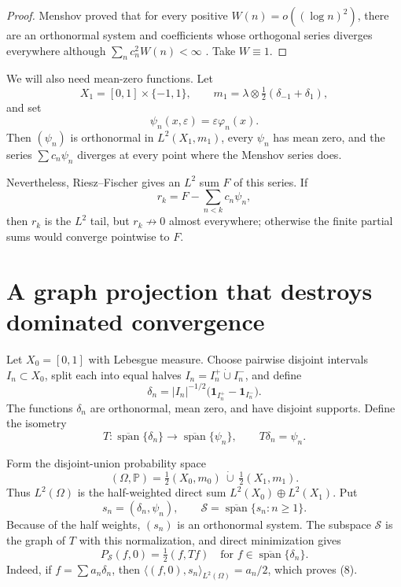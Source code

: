 \documentclass[11pt]{article}
\newcommand{\cS}{\mathcal S}
\begin{document}
\begin{proof}
Menshov proved that for every positive
\(W(n)=o((\log n)^2)\), there are an orthonormal system and coefficients
whose orthogonal series diverges everywhere although
\(\sum_n c_n^2W(n)<\infty\) \cite{Menshov}. Take \(W\equiv1\).
\end{proof}

We will also need mean-zero functions. Let
\[
 X_1=[0,1]\times\{-1,1\},
 \qquad m_1=\lambda\otimes\tfrac12(\delta_{-1}+\delta_1),
\]
and set
\[
 \psi_n(x,\varepsilon)=\varepsilon\varphi_n(x).
 \tag{3}
\]
Then \((\psi_n)\) is orthonormal in \(L^2(X_1,m_1)\), every \(\psi_n\)
has mean zero, and the series \(\sum c_n\psi_n\) diverges at every point
where the Menshov series does.

Nevertheless, Riesz--Fischer gives an \(L^2\) sum \(F\) of this series. If
\[
 r_k=F-\sum_{n<k}c_n\psi_n,
 \tag{4}
\]
then \(r_k\) is the \(L^2\) tail, but \(r_k\not\to0\) almost everywhere;
otherwise the finite partial sums would converge pointwise to \(F\).

\section{A graph projection that destroys dominated convergence}

Let \(X_0=[0,1]\) with Lebesgue measure. Choose pairwise disjoint intervals
\(I_n\subset X_0\), split each into equal halves
\(I_n=I_n^+\mathbin{\dot\cup}I_n^-\), and define
\[
 \delta_n=|I_n|^{-1/2}
 \bigl(\mathbf1_{I_n^+}-\mathbf1_{I_n^-}\bigr).
 \tag{5}
\]
The functions \(\delta_n\) are orthonormal, mean zero, and have disjoint
supports. Define the isometry
\[
 T:\overline{\operatorname{span}}\{\delta_n\}
 \longrightarrow
 \overline{\operatorname{span}}\{\psi_n\},
 \qquad T\delta_n=\psi_n.
 \tag{6}
\]

Form the disjoint-union probability space
\[
 (\Omega,\mathbb P)=\tfrac12(X_0,m_0)\ \dot\cup\
                    \tfrac12(X_1,m_1).
\]
Thus \(L^2(\Omega)\) is the half-weighted direct sum
\(L^2(X_0)\oplus L^2(X_1)\). Put
\[
 s_n=(\delta_n,\psi_n),
 \qquad
 \cS=\overline{\operatorname{span}}\{s_n:n\ge1\}.
 \tag{7}
\]
Because of the half weights, \((s_n)\) is an orthonormal system. The
subspace \(\cS\) is the graph of \(T\) with this normalization, and direct
minimization gives
\begin{equation}
 P_{\cS}(f,0)=\tfrac12(f,Tf)
 \quad\text{for }f\in\overline{\operatorname{span}}\{\delta_n\}.
 \tag{8}
\end{equation}
Indeed, if \(f=\sum a_n\delta_n\), then
\(\langle(f,0),s_n\rangle_{L^2(\Omega)}=a_n/2\), which proves (8).
\end{document}
